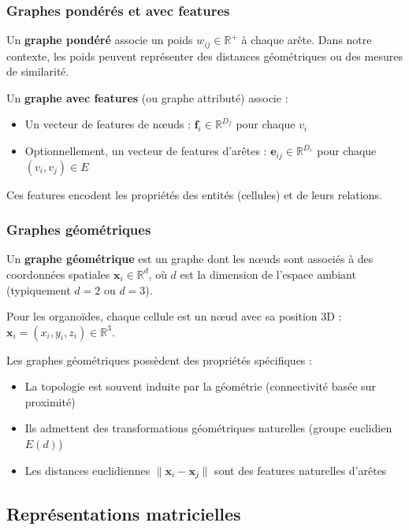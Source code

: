 \subsubsection{Graphes pondérés et avec features}

Un \textbf{graphe pondéré} associe un poids $w_{ij} \in \mathbb{R}^+$ à chaque arête. Dans notre contexte, les poids peuvent représenter des distances géométriques ou des mesures de similarité.

Un \textbf{graphe avec features} (ou graphe attributé) associe :
\begin{itemize}
    \item Un vecteur de features de nœuds : $\mathbf{f}_i \in \mathbb{R}^{D_f}$ pour chaque $v_i$
    \item Optionnellement, un vecteur de features d'arêtes : $\mathbf{e}_{ij} \in \mathbb{R}^{D_e}$ pour chaque $(v_i, v_j) \in E$
\end{itemize}

Ces features encodent les propriétés des entités (cellules) et de leurs relations.

\subsubsection{Graphes géométriques}

Un \textbf{graphe géométrique} est un graphe dont les nœuds sont associés à des coordonnées spatiales $\mathbf{x}_i \in \mathbb{R}^d$, où $d$ est la dimension de l'espace ambiant (typiquement $d = 2$ ou $d = 3$).

Pour les organoïdes, chaque cellule est un nœud avec sa position 3D : $\mathbf{x}_i = (x_i, y_i, z_i) \in \mathbb{R}^3$.

Les graphes géométriques possèdent des propriétés spécifiques :
\begin{itemize}
    \item La topologie est souvent induite par la géométrie (connectivité basée sur proximité)
    \item Ils admettent des transformations géométriques naturelles (groupe euclidien $E(d)$)
    \item Les distances euclidiennes $\|\mathbf{x}_i - \mathbf{x}_j\|$ sont des features naturelles d'arêtes
\end{itemize}

\subsection{Représentations matricielles}

